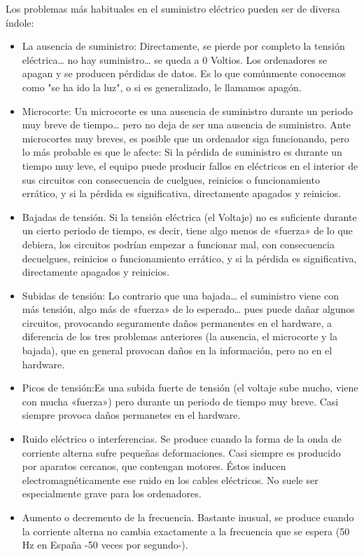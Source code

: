\documentclass{article}
\begin{document}
Los problemas más habituales en el suministro eléctrico pueden ser de diversa índole:
\begin{itemize}
\item La ausencia de suministro: Directamente, se pierde por completo la tensión eléctrica\ldots{} no hay suministro\ldots{} se queda a 0 Voltios. Los ordenadores se apagan y se producen pérdidas de datos. Es lo que comúnmente conocemos como "se ha ido la luz", o si es generalizado, le llamamos apagón.
\item Microcorte: Un microcorte es una ausencia de suministro durante un periodo muy breve de tiempo\ldots{} pero no deja de ser una ausencia de suministro. Ante microcortes muy breves, es posible que un ordenador siga funcionando, pero lo más probable es que le afecte: Si la pérdida de suministro es durante un tiempo muy leve, el equipo puede producir fallos en eléctricos en el interior de sus circuitos con consecuencia de cuelgues, reinicios o funcionamiento errático, y si la pérdida es significativa, directamente apagados y reinicios.
\item Bajadas de tensión. Si la tensión eléctrica (el Voltaje) no es suficiente durante un cierto periodo de tiempo, es decir, tiene algo menos de «fuerza» de lo que debiera, los circuitos podrían empezar a funcionar mal, con consecuencia decuelgues, reinicios o funcionamiento errático, y si la pérdida es significativa, directamente apagados y reinicios.
\item Subidas de tensión: Lo contrario que una bajada\ldots{} el suministro viene con más tensión, algo más de «fuerza» de lo esperado\ldots{} pues puede dañar algunos circuitos, provocando seguramente daños permanentes en el hardware, a diferencia de los tres problemas anteriores (la ausencia, el microcorte y la bajada), que en general provocan daños en la información, pero no en el hardware.
\item Picos de tensión:Es una subida fuerte de tensión (el voltaje sube mucho, viene con mucha «fuerza») pero durante un periodo de tiempo muy breve. Casi siempre provoca daños permanetes en el hardware.
\item Ruido eléctrico o interferencias. Se produce cuando la forma de la onda de corriente alterna sufre pequeñas deformaciones. Casi siempre es producido por aparatos cercanos, que contengan motores. Éstos inducen electromagnéticamente ese ruido en los cables eléctricos. No suele ser especialmente grave para los ordenadores.
\item Aumento o decremento de la frecuencia. Bastante inusual, se produce cuando la corriente alterna no cambia exactamente a la frecuencia que se espera (50 Hz en España -50 veces por segundo-).
\end{itemize}
\end{document}
